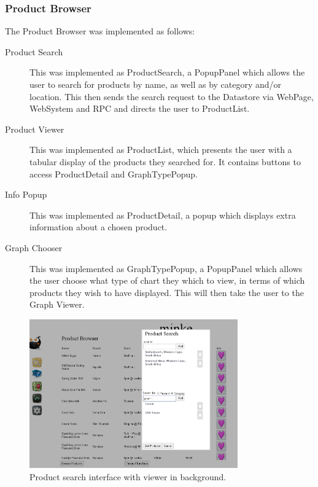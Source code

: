 \subsubsection{Product Browser}
The Product Browser was implemented as follows:
\begin{description}
\item[Product Search] This was implemented as ProductSearch, a PopupPanel which allows the user to 
search for products by name, as well as by category and/or location. This then sends the search request
 to the Datastore via WebPage, WebSystem and RPC and directs the user to
 ProductList.
 \item[Product Viewer]This was implemented as ProductList, which presents the
 user with a tabular display of the products they searched for. It contains buttons to access ProductDetail and GraphTypePopup.
\item[Info Popup] This was implemented as ProductDetail, a popup which displays
extra information about a chosen product.
\item[Graph Chooser] This was implemented as GraphTypePopup, a PopupPanel
which allows the user choose what type of chart they which to view, in terms of
which products they wish to have displayed. This will then take the user to
the Graph Viewer.
\end{description} 
\begin{figure}[h!]
\centering
\includegraphics[width=0.8\textwidth]{gwt-search.png}
\caption{Product search interface with viewer in background.}
\end{figure}